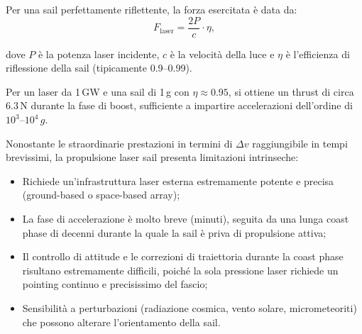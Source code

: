 \documentclass[11pt,a4paper]{article}
\theoremstyle{plain}
\theoremstyle{definition}
\begin{document}
\vspace{0.3cm}

Per una sail perfettamente riflettente, la forza esercitata è data da:
\begin{equation}
F_{\text{laser}} = \frac{2P}{c} \cdot \eta,
\label{eq:laser_thrust}
\end{equation}

\vspace{0.2cm}


dove $P$ è la potenza laser incidente, $c$ è la velocità della luce e $\eta$ è l’efficienza di riflessione della sail (tipicamente 0.9–0.99). 

\vspace{0.6cm}

Per un laser da 1\,GW e una sail di 1\,g con $\eta \approx 0.95$, si ottiene un thrust di circa 6.3\,N durante la fase di boost, sufficiente a impartire accelerazioni dell’ordine di $10^3$--$10^4\,g$.


\vspace{0.2cm}

Nonostante le straordinarie prestazioni in termini di $\Delta v$ raggiungibile in tempi brevissimi, la propulsione laser sail presenta limitazioni intrinseche:

\vspace{0.1cm}
\begin{itemize}
    \item Richiede un’infrastruttura laser esterna estremamente potente e precisa (ground-based o space-based array);

    \vspace{0.1cm}
    \item La fase di accelerazione è molto breve (minuti), seguita da una lunga coast phase di decenni durante la quale la sail è priva di propulsione attiva;

    \vspace{0.1cm}
    \item Il controllo di attitude e le correzioni di traiettoria durante la coast phase risultano estremamente difficili, poiché la sola pressione laser richiede un pointing continuo e precisissimo del fascio;

    \vspace{0.1cm}
    \item Sensibilità a perturbazioni (radiazione cosmica, vento solare, micrometeoriti) che possono alterare l’orientamento della sail.
\end{itemize}

\vspace{0.2cm}
\end{document}
